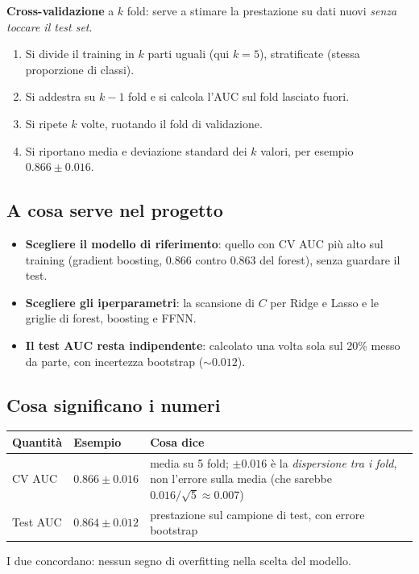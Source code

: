 \documentclass[10.5pt,a4paper]{article}
\begin{document}
\textbf{Cross-validazione} a $k$ fold: serve a stimare la prestazione su dati nuovi \emph{senza toccare il test set}.
\begin{enumerate}
\item Si divide il training in $k$ parti uguali (qui $k=5$), stratificate (stessa proporzione di classi).
\item Si addestra su $k-1$ fold e si calcola l'AUC sul fold lasciato fuori.
\item Si ripete $k$ volte, ruotando il fold di validazione.
\item Si riportano media e deviazione standard dei $k$ valori, per esempio $0.866\pm0.016$.
\end{enumerate}

\subsection*{A cosa serve nel progetto}
\begin{itemize}
\item \textbf{Scegliere il modello di riferimento}: quello con CV AUC più alto sul training (gradient boosting, $0.866$ contro $0.863$ del
forest), senza guardare il test.
\item \textbf{Scegliere gli iperparametri}: la scansione di $C$ per Ridge e Lasso e le griglie di forest, boosting e FFNN.
\item \textbf{Il test AUC resta indipendente}: calcolato una volta sola sul 20\% messo da parte, con incertezza bootstrap ($\sim0.012$).
\end{itemize}

\subsection*{Cosa significano i numeri}
\begin{center}\small\begin{tabular}{p{2.6cm}p{3.2cm}p{7.2cm}}\toprule
Quantità & Esempio & Cosa dice\\\midrule
CV AUC & $0.866\pm0.016$ & media su 5 fold; $\pm0.016$ è la \emph{dispersione tra i fold}, non l'errore sulla media (che sarebbe $0.016/\sqrt5\approx0.007$)\\
Test AUC & $0.864\pm0.012$ & prestazione sul campione di test, con errore bootstrap\\\bottomrule
\end{tabular}\end{center}
I due concordano: nessun segno di overfitting nella scelta del modello.
\end{document}
